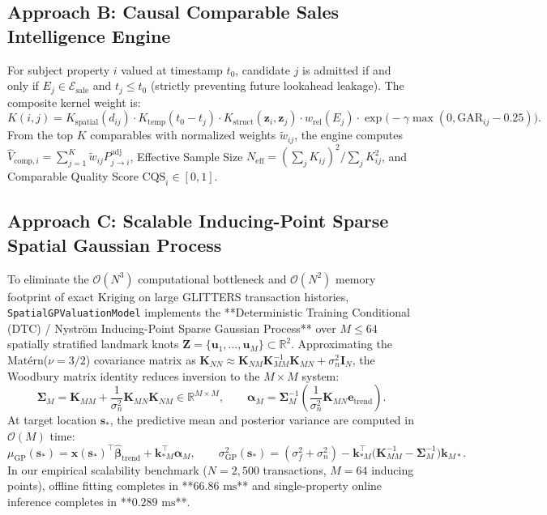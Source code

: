 \documentclass[11pt,a4paper]{article}
\begin{document}
\subsection{Approach B: Causal Comparable Sales Intelligence Engine}
For subject property $i$ valued at timestamp $t_0$, candidate $j$ is admitted if and only if $E_j \in \mathcal{E}_{\text{sale}}$ and $t_j \le t_0$ (strictly preventing future lookahead leakage). The composite kernel weight is:
\begin{equation}
    K(i, j) = K_{\text{spatial}}(d_{ij}) \cdot K_{\text{temp}}(t_0 - t_j) \cdot K_{\text{struct}}(\mathbf{z}_i, \mathbf{z}_j) \cdot w_{\text{rel}}(E_j) \cdot \exp\bigl(-\gamma \max(0, \text{GAR}_{ij} - 0.25)\bigr).
\end{equation}
From the top $K$ comparables with normalized weights $\tilde{w}_{ij}$, the engine computes $\hat{V}_{\text{comp},i} = \sum_{j=1}^K \tilde{w}_{ij} P_{j \to i}^{\text{adj}}$, Effective Sample Size $N_{\text{eff}} = (\sum_j K_{ij})^2 / \sum_j K_{ij}^2$, and Comparable Quality Score $\text{CQS}_i \in [0,1]$.

\subsection{Approach C: Scalable Inducing-Point Sparse Spatial Gaussian Process}
To eliminate the $\mathcal{O}(N^3)$ computational bottleneck and $\mathcal{O}(N^2)$ memory footprint of exact Kriging on large GLITTERS transaction histories, \texttt{SpatialGPValuationModel} implements the **Deterministic Training Conditional (DTC) / Nystr\"om Inducing-Point Sparse Gaussian Process** over $M \le 64$ spatially stratified landmark knots $\mathbf{Z} = \{\mathbf{u}_1, \dots, \mathbf{u}_M\} \subset \mathbb{R}^2$. Approximating the Mat\'ern($\nu=3/2$) covariance matrix as $\mathbf{K}_{NN} \approx \mathbf{K}_{NM} \mathbf{K}_{MM}^{-1} \mathbf{K}_{MN} + \sigma_n^2 \mathbf{I}_N$, the Woodbury matrix identity reduces inversion to the $M \times M$ system:
\begin{equation}
    \boldsymbol{\Sigma}_M = \mathbf{K}_{MM} + \frac{1}{\sigma_n^2} \mathbf{K}_{MN} \mathbf{K}_{NM} \in \mathbb{R}^{M \times M}, \qquad \boldsymbol{\alpha}_M = \boldsymbol{\Sigma}_M^{-1} \left(\frac{1}{\sigma_n^2} \mathbf{K}_{MN} \mathbf{e}_{\text{trend}}\right).
\end{equation}
At target location $\mathbf{s}_*$, the predictive mean and posterior variance are computed in $\mathcal{O}(M)$ time:
\begin{equation}
    \mu_{\text{GP}}(\mathbf{s}_*) = \mathbf{x}(\mathbf{s}_*)^\top \hat{\boldsymbol{\beta}}_{\text{trend}} + \mathbf{k}_{*M}^\top \boldsymbol{\alpha}_M, \qquad \sigma_{\text{GP}}^2(\mathbf{s}_*) = (\sigma_f^2 + \sigma_n^2) - \mathbf{k}_{*M}^\top \bigl(\mathbf{K}_{MM}^{-1} - \boldsymbol{\Sigma}_M^{-1}\bigr) \mathbf{k}_{M*}.
\end{equation}
In our empirical scalability benchmark ($N = 2,500$ transactions, $M = 64$ inducing points), offline fitting completes in **$66.86\text{ ms}$** and single-property online inference completes in **$0.289\text{ ms}$**.
\end{document}
